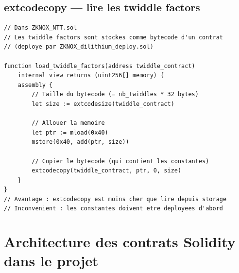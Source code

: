 \documentclass[12pt, a4paper]{article}
\begin{document}
\subsection{extcodecopy --- lire les twiddle factors}

\begin{lstlisting}[style=solidity]
// Dans ZKNOX_NTT.sol
// Les twiddle factors sont stockes comme bytecode d'un contrat
// (deploye par ZKNOX_dilithium_deploy.sol)

function load_twiddle_factors(address twiddle_contract)
    internal view returns (uint256[] memory) {
    assembly {
        // Taille du bytecode (= nb_twiddles * 32 bytes)
        let size := extcodesize(twiddle_contract)

        // Allouer la memoire
        let ptr := mload(0x40)
        mstore(0x40, add(ptr, size))

        // Copier le bytecode (qui contient les constantes)
        extcodecopy(twiddle_contract, ptr, 0, size)
    }
}
// Avantage : extcodecopy est moins cher que lire depuis storage
// Inconvenient : les constantes doivent etre deployees d'abord
\end{lstlisting}

\section{Architecture des contrats Solidity dans le projet}
\end{document}

